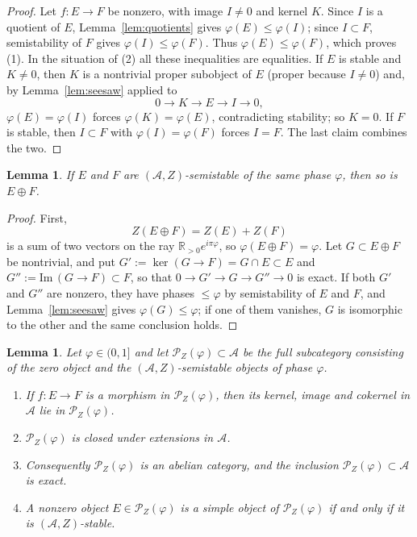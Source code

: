 \documentclass[12pt]{amsart}
\newtheorem{lemma}[theorem]{Lemma}
\numberwithin{theorem}{section}
\theoremstyle{definition}
\newcommand{\RR}{\mathbb{R}}
\newcommand{\calA}{\mathcal{A}}
\newcommand{\calP}{\mathcal{P}}
\newcommand{\image}{\mathrm{Im} \,}
\begin{document}
	\begin{proof}
		Let $f \colon E \to F$ be nonzero, with image $I \neq 0$ and kernel $K$. 
		Since $I$ is a quotient of $E$, Lemma~\ref{lem:quotients} gives $\varphi(E) \leqslant \varphi(I)$; 
		since $I \subset F$, semistability of $F$ gives $\varphi(I) \leqslant \varphi(F)$. 
		Thus $\varphi(E) \leqslant \varphi(F)$, which proves (1). 
		In the situation of (2) all these inequalities are equalities. 
		If $E$ is stable and $K \neq 0$, 
		then $K$ is a nontrivial proper subobject of $E$ (proper because $I \neq 0$) and, 
		by Lemma~\ref{lem:seesaw} applied to 
		\[0 \to K \to E \to I \to 0, \] 
		$\varphi(E) = \varphi(I)$ forces $\varphi(K) = \varphi(E)$, contradicting stability; so $K = 0$. If $F$ is stable, then $I \subset F$ with $\varphi(I) = \varphi(F)$ forces $I = F$. The last claim combines the two.
	\end{proof}
	
	\begin{lemma}
		\label{lem:direct_sums}
		If $E$ and $F$ are $(\calA, Z)$-semistable of the same phase $\varphi$, then so is $E \oplus F$.
	\end{lemma}
	
	\begin{proof}
		First, 
		\[ Z(E \oplus F) = Z(E) + Z(F) \] 
		is a sum of two vectors on the ray $\RR_{>0} e^{i \pi \varphi}$, so $\varphi(E \oplus F) = \varphi$. Let $G \subset E \oplus F$ be nontrivial, and put $G' := \ker(G \to F) = G \cap E \subset E$ and $G'' := \image(G \to F) \subset F$, so that $0 \to G' \to G \to G'' \to 0$ is exact. If both $G'$ and $G''$ are nonzero, they have phases $\leqslant \varphi$ by semistability of $E$ and $F$, and Lemma~\ref{lem:seesaw} gives $\varphi(G) \leqslant \varphi$; if one of them vanishes, $G$ is isomorphic to the other and the same conclusion holds.
	\end{proof}

	\begin{lemma}
		\label{lem:semistable_abelian}
		Let $\varphi \in (0, 1]$ and let $\calP_Z(\varphi) \subset \calA$ be the full subcategory consisting of the zero object and the $(\calA, Z)$-semistable objects of phase $\varphi$.
		\begin{enumerate}
			\item If $f \colon E \to F$ is a morphism in $\calP_Z(\varphi)$, then its kernel, image and cokernel in $\calA$ lie in $\calP_Z(\varphi)$.
			\item $\calP_Z(\varphi)$ is closed under extensions in $\calA$.
			\item Consequently $\calP_Z(\varphi)$ is an abelian category, and the inclusion $\calP_Z(\varphi) \subset \calA$ is exact.
			\item A nonzero object $E \in \calP_Z(\varphi)$ is a simple object of $\calP_Z(\varphi)$ if and only if it is $(\calA, Z)$-stable.
		\end{enumerate}
	\end{lemma}
\end{document}
